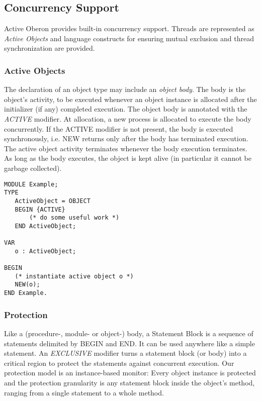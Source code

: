 \documentclass[a4paper,11pt]{article}
\begin{document}
\subsection{Concurrency Support}
Active Oberon provides built-in concurrency support. Threads are represented as {\em Active Objects} and language constructs for ensuring mutual exclusion and thread synchronization are provided.

\subsubsection{Active Objects}
The declaration of an object type may include an \emph{object body}. The body is the object's activity, to be executed whenever an object instance is allocated after the initializer (if any) completed execution. The object body is annotated with the \emph{ACTIVE} modifier. At allocation, a new process is allocated to execute the body concurrently.
If the ACTIVE modifier is not present, the body is executed synchronously, i.e. NEW returns only after the body has terminated execution.
The active object activity terminates whenever the body execution terminates. As long as the body executes, the object is kept alive (in particular it cannot be garbage collected).

\begin{lstlisting}[language=Oberon,frame=none,caption=Example of an active object]
MODULE Example;
TYPE
   ActiveObject = OBJECT
   BEGIN {ACTIVE}
       (* do some useful work *)
   END ActiveObject;

VAR
   o : ActiveObject;

BEGIN
   (* instantiate active object o *)
   NEW(o);
END Example.
\end{lstlisting}

\subsubsection{Protection}
Like a (procedure-, module- or object-) body, a Statement Block is a sequence of statements delimited by BEGIN and END. It can be used anywhere like a simple statement. An {\em EXCLUSIVE} modifier turns a statement block (or body) into a critical region to protect the statements against concurrent execution. Our protection model is an instance-based monitor: Every object instance is protected and the protection granularity is any statement block inside the object's method, ranging from a single statement to a whole method.
\end{document}
